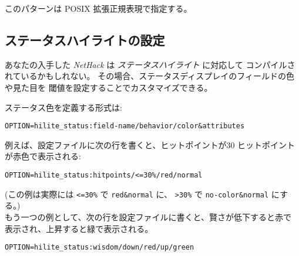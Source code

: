 このパターンは POSIX 拡張正規表現で指定する。

\subsection*{ステータスハイライトの設定}

あなたの入手した {\it NetHack\/} は {\it ステータスハイライト} に対応して
コンパイルされているかもしれない。
その場合、ステータスディスプレイのフィールドの色や見た目を
閾値を設定することでカスタマイズできる。

ステータス色を定義する形式は:\\
\begin{verbatim}
OPTION=hilite_status:field-name/behavior/color&attributes
\end{verbatim}

例えば、設定ファイルに次の行を書くと、ヒットポイントが30%
ヒットポイントが赤色で表示される:\\
\begin{verbatim}
OPTION=hilite_status:hitpoints/<=30%/red/normal
\end{verbatim}
(この例は実際には {\tt <=30\%} で {\tt red\&normal} に、
{\tt >30\%} で {\tt no-color\&normal} にする。)\\

もう一つの例として、次の行を設定ファイルに書くと、賢さが低下すると赤で
表示され、上昇すると緑で表示される。\\
\begin{verbatim}
OPTION=hilite_status:wisdom/down/red/up/green
\end{verbatim}

